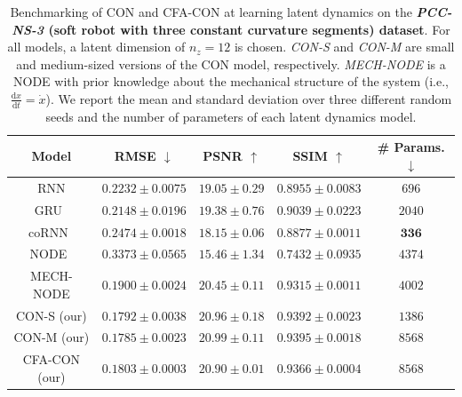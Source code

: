 \begin{table}[ht]
    \centering
    \begin{scriptsize}
    \begin{tabular}{c c c c c}
         \toprule
         \textbf{Model} & \textbf{RMSE} $\downarrow$ & \textbf{PSNR} $\uparrow$ & \textbf{SSIM} $\uparrow$ & \textbf{\# Params.} $\downarrow$ \\
         \midrule
         RNN & $0.2232 \pm 0.0075$ & $19.05 \pm 0.29$ & $0.8955 \pm 0.0083$ & $696$\\
         GRU~\citep{cho2014learning} & $0.2148 \pm 0.0196$ & $19.38 \pm 0.76$ & $0.9039 \pm 0.0223$ & $2040$\\
         coRNN~\citep{rusch2020coupled} & $0.2474 \pm 0.0018$ & $18.15 \pm 0.06$ & $0.8877 \pm 0.0011$ & $\mathbf{336}$\\
         NODE~\citep{chen2018neural} & $0.3373 \pm 0.0565$ & $15.46 \pm 1.34$ & $0.7432 \pm 0.0935$ & $4374$\\
         MECH-NODE & $0.1900 \pm 0.0024$ & $20.45 \pm 0.11$ & $0.9315 \pm 0.0011$ & $4002$\\
         CON-S (our) & $\mathbf{0.1792 \pm 0.0038}$ & $\mathbf{20.96 \pm 0.18}$ & $\mathbf{0.9392 \pm 0.0023}$ & $1386$\\
         CON-M (our) & $\mathbf{0.1785 \pm 0.0023}$ & $\mathbf{20.99 \pm 0.11}$ & $\mathbf{0.9395 \pm 0.0018}$ & $8568$\\
         CFA-CON (our) & $0.1803 \pm 0.0003$ & $20.90 \pm 0.01$ & $0.9366 \pm 0.0004$ & $8568$\\
         \bottomrule
    \end{tabular}
    \end{scriptsize}
    \vspace{0.5cm}
    \caption{Benchmarking of \gls{CON} and \gls{CFA-CON} at learning latent dynamics on the \textbf{\emph{PCC-NS-3} (soft robot with three constant curvature segments) dataset}. For all models, a latent dimension of $n_z=12$ is chosen. \emph{CON-S} and \emph{CON-M} are small and medium-sized versions of the \gls{CON} model, respectively. \emph{MECH-NODE} is a \gls{NODE} with prior knowledge about the mechanical structure of the system (i.e., $\frac{\mathrm{d}x}{\mathrm{d}t} = \dot{x}$). We report the mean and standard deviation over three different random seeds and the number of parameters of each latent dynamics model.
}
    \label{tab:apx-con:latent_dynamics_results:pcc_ns-3}
\end{table}


